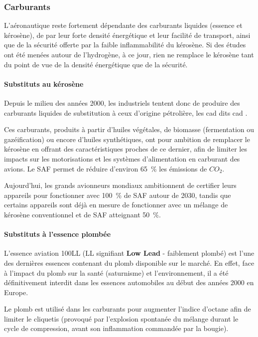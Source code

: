 	\subsubsection{Carburants}
	L'aéronautique reste fortement dépendante des carburants liquides (essence et kérosène), de par leur forte densité énergétique et leur facilité de transport, ainsi que de la sécurité offerte par la faible inflammabilité du kérosène. Si des études ont été menées autour de l'hydrogène, à ce jour, rien ne remplace le kérosène tant du point de vue de la densité énergétique que de la sécurité.
	
	\paragraph{Substituts au kérosène}
	Depuis le milieu des années 2000, les industriels tentent donc de produire des carburants liquides de substitution à ceux d'origine pétrolière, les \acrlong{cad} dits \acrshort{cad} .
	
	Ces carburants, produits à partir d'huiles végétales, de biomasse (fermentation ou gazéification) ou encore d'huiles synthétiques, ont pour ambition de remplacer le kérosène en offrant des caractéristiques proches de ce dernier, afin de limiter les impacts sur les motorisations et les systèmes d'alimentation en carburant des avions. Le SAF permet de réduire d'environ 65~\% les émissions de $CO_2$.
	
	Aujourd'hui, les grands avionneurs mondiaux ambitionnent de certifier leurs appareils pour fonctionner avec 100~\% de SAF autour de 2030, tandis que certains appareils sont déjà en mesure de fonctionner avec un mélange de kérosène conventionnel et de SAF atteignant 50~\%.
	
	\paragraph{Substituts à l'essence plombée}
	L'essence aviation 100LL (LL signifiant \textbf{Low Lead} - faiblement plombé) est l'une des dernières essences contenant du plomb disponible sur le marché. En effet, face à l'impact du plomb sur la santé (saturnisme) et l'environnement, il a été définitivement interdit dans les essences automobiles au début des années 2000 en Europe.
	
	Le plomb est utilisé dans les carburants pour augmenter l'indice d'octane afin de limiter le cliquetis (provoqué par l'explosion spontanée du mélange durant le cycle de compression, avant son inflammation commandée par la bougie). \\
	

